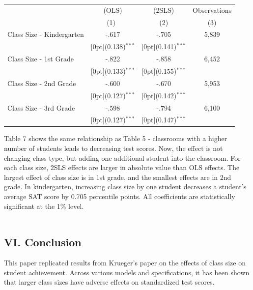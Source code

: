 \documentclass[a4paper,11pt]{article}
\begin{document}
\begin{table}[H]
\begin{tabular*}{\textwidth}{@{\extracolsep{\fill}}lccc}		
	& \multicolumn{1}{c}{(OLS)} &	\multicolumn{1}{c}{(2SLS)} &	\multicolumn{1}{c}{Observations}\\
	\cline{2-4}		
	& \multicolumn{1}{c}{(1)\mbox{\ }} &	\multicolumn{1}{c}{(2)}  & \multicolumn{1}{c}{(3)} \\
	\hline		
	Class Size - Kindergarten&	-.617 &	-.705  & 5,839 \\
	&	\raisebox{.7ex}[0pt]{\scriptsize (0.138)$^{***}$} &	\raisebox{.7ex}[0pt]{\scriptsize (0.141)$^{***}$} &\\
	Class Size - 1st Grade &	-.822 &	-.858 & 6,452 \\
	&	\raisebox{.7ex}[0pt]{\scriptsize (0.133)$^{***}$} &	\raisebox{.7ex}[0pt]{\scriptsize (0.155)$^{***}$} & \\
	Class Size - 2nd Grade &	-.600 &	-.670 & 5,953 \\
	&	\raisebox{.7ex}[0pt]{\scriptsize (0.127)$^{***}$} &	\raisebox{.7ex}[0pt]{\scriptsize (0.142)$^{***}$} & \\	
	Class Size - 3rd Grade &	-.598 &	-.794 & 6,100 \\
	&	\raisebox{.7ex}[0pt]{\scriptsize (0.127)$^{***}$} &	\raisebox{.7ex}[0pt]{\scriptsize (0.147)$^{***}$} & \\
	\hline\hline		
\end{tabular*}
\end{table}

Table 7 shows the same relationship as Table 5 - classrooms with a higher number of students leads to decreasing test scores. Now, the effect is not changing class type, but adding one additional student into the classroom. For each class size, 2SLS effects are larger in absolute value than OLS effects. The largest effect of class size is in 1st grade, and the smallest effects are in 2nd grade. In kindergarten, increasing class size by one student decreases a student's average SAT score by 0.705 percentile points. All coefficients are statistically significant at the 1\% level. \\ \\ 



\subsection*{VI. Conclusion}

This paper replicated results from Krueger's paper on the effects of class size on student achievement. Across various models and specifications, it has been shown that larger class sizes have adverse effects on standardized test scores. \par
\end{document}
